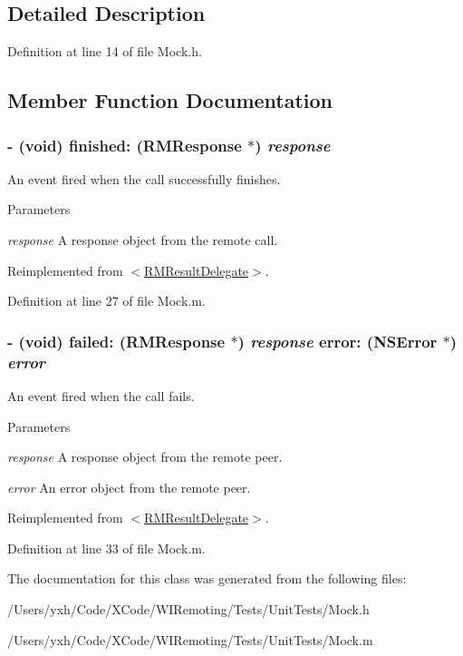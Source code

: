 \subsection{Detailed Description}


Definition at line 14 of file Mock.h.

\subsection{Member Function Documentation}
\hypertarget{interface_mock_ab15e59579bf7b5c5de900d28374062b7}{
\subsubsection[{finished:}]{\setlength{\rightskip}{0pt plus 5cm}-\/ (void) finished: ({\bf RMResponse} $\ast$) {\em response}}}
\label{interface_mock_ab15e59579bf7b5c5de900d28374062b7}


An event fired when the call successfully finishes. 
\begin{DoxyParams}{Parameters}
\item[{\em response}]A response object from the remote call. \end{DoxyParams}


Reimplemented from \hyperlink{protocol_r_m_result_delegate-p_a965fe7cc4e150bb6ecf7cbb02b9c7248}{$<$RMResultDelegate$>$}.

Definition at line 27 of file Mock.m.\hypertarget{interface_mock_ae57e780c8ddcf5c4c79af12c54d58cff}{
\subsubsection[{failed:error:}]{\setlength{\rightskip}{0pt plus 5cm}-\/ (void) failed: ({\bf RMResponse} $\ast$) {\em response}\/ error: (NSError $\ast$) {\em error}}}
\label{interface_mock_ae57e780c8ddcf5c4c79af12c54d58cff}


An event fired when the call fails. 
\begin{DoxyParams}{Parameters}
\item[{\em response}]A response object from the remote peer. \item[{\em error}]An error object from the remote peer. \end{DoxyParams}


Reimplemented from \hyperlink{protocol_r_m_result_delegate-p_a3521cd9555449b32aabdb759d2dadce5}{$<$RMResultDelegate$>$}.

Definition at line 33 of file Mock.m.

The documentation for this class was generated from the following files:\begin{DoxyCompactItemize}
\item 
/Users/yxh/Code/XCode/WIRemoting/Tests/UnitTests/Mock.h\item 
/Users/yxh/Code/XCode/WIRemoting/Tests/UnitTests/Mock.m\end{DoxyCompactItemize}
